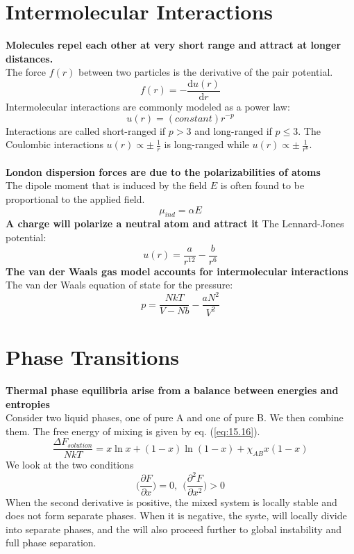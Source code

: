 \documentclass[8pt]{article}
\numberwithin{equation}{section}
\begin{document}
\begin{multicols}{2}
\section{Intermolecular Interactions}
\textbf{Molecules repel each other at very short range and attract at longer distances.}\\ 
The force $f(r)$ between two particles is the derivative of the pair potential. 
\begin{equation}
f(r)=-\frac{\mathrm{d}u(r)}{\mathrm{d}r} \tag{24.1}
\end{equation}
Intermolecular interactions are commonly modeled as a power law: 
\begin{equation}
u(r)=(constant)r^{-p} \tag{24.2} 
\end{equation}
Interactions are called short-ranged if $p>3$ and long-ranged if $p\leq 3$. 
The Coulombic interactions $u(r)\propto \pm\ \frac{1}{r}$ is long-ranged while $u(r)\propto\pm \ \frac{1}{r^{6}}$. 
\\
\\
\textbf{London dispersion forces are due to the polarizabilities of atoms} \\
The dipole moment that is induced by the field $E$ is often found to be proportional to the applied field. 
\begin{equation}
\mu_{ind}=\alpha E \tag{24.9}
\end{equation}
\textbf{A charge will polarize a neutral atom and attract it}
The Lennard-Jones potential: 
\begin{equation}
u(r)=\frac{a}{r^{12}}-\frac{b}{r^{6}} 
\end{equation}
\textbf{The van der Waals gas model accounts for intermolecular interactions} \\
The van der Waals equation of state for the pressure: 
\begin{equation}
p=\frac{NkT}{V-Nb}-\frac{aN^{2}}{V^{2}} \tag{24.15}
\end{equation}
\section{Phase Transitions}
\textbf{Thermal phase equilibria arise from a balance between energies and entropies } \\
Consider two liquid phases, one of pure A and one of pure B. We then combine them. The free energy of mixing is given by eq. (\ref{eq:15.16}).
\begin{equation*}
\frac{\Delta F_{solution}}{NkT}=x\ln{x}+(1-x)\ln{(1-x)}+\chi_{AB}x(1-x)
\end{equation*}
We look at the two conditions  
\begin{equation} \tag{25.13}
\bigg(\frac{\partial F}{\partial x} \bigg)=0, \ \ \bigg(\frac{\partial^{2} F}{\partial x^{2}} \bigg)>0 
\end{equation}
When the second derivative is positive, the mixed system is locally stable and does not form separate phases. When it is negative, the syste, will locally divide into separate phases, and the will also proceed further to global instability and full phase separation.
\setcounter{section}{26}

\end{multicols}
\end{document}
